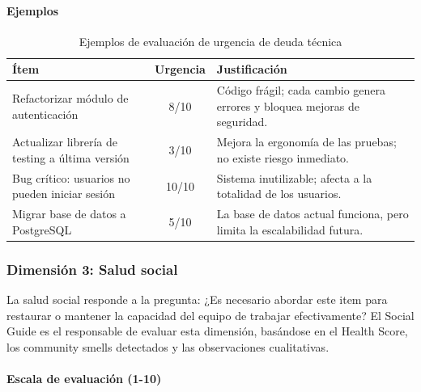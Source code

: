 \paragraph{Ejemplos}

\begin{table}[h]
    \centering
    \small
    \begin{tabularx}{\textwidth}{|X|c|X|}
        \hline
        \textbf{Ítem} & \textbf{Urgencia}                                                         & \textbf{Justificación} \\
        \hline
        Refactorizar módulo de autenticación
                      & 8/10
                      & Código frágil; cada cambio genera errores y bloquea mejoras de seguridad.                          \\
        \hline
        Actualizar librería de testing a última versión
                      & 3/10
                      & Mejora la ergonomía de las pruebas; no existe riesgo inmediato.                                    \\
        \hline
        Bug crítico: usuarios no pueden iniciar sesión
                      & 10/10
                      & Sistema inutilizable; afecta a la totalidad de los usuarios.                                       \\
        \hline
        Migrar base de datos a PostgreSQL
                      & 5/10
                      & La base de datos actual funciona, pero limita la escalabilidad futura.                             \\
        \hline
    \end{tabularx}
    \caption{Ejemplos de evaluación de urgencia de deuda técnica}
    \label{tab:ejemplos-urgencia}
\end{table}

\FloatBarrier

\subsubsection{Dimensión 3: Salud social}

La salud social responde a la pregunta: ¿Es necesario abordar este item para restaurar o mantener la capacidad del equipo de trabajar efectivamente? El Social Guide es el responsable de evaluar esta dimensión, basándose en el Health Score, los community smells detectados y las observaciones cualitativas.

\paragraph{Escala de evaluación (1-10)}

